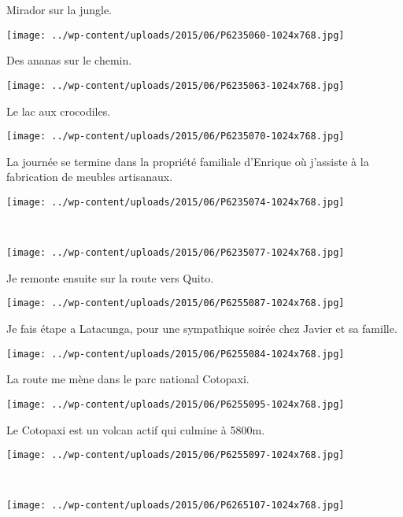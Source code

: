 Mirador sur la jungle. \\
\begin{center} 
\texttt{[image: ../wp-content/uploads/2015/06/P6235060-1024x768.jpg]} 
\end{center}

Des ananas sur le chemin. 
\begin{center} 
\texttt{[image: ../wp-content/uploads/2015/06/P6235063-1024x768.jpg]} 
\end{center}
\vspace{-\topsep}
\pagebreak

Le lac aux crocodiles. 
\begin{center} 
\texttt{[image: ../wp-content/uploads/2015/06/P6235070-1024x768.jpg]} 
\end{center}

La journée se termine dans la propriété familiale d'Enrique où j'assiste à la fabrication de meubles artisanaux. 
\begin{center} 
\texttt{[image: ../wp-content/uploads/2015/06/P6235074-1024x768.jpg]} 
\end{center}
\vspace{-\topsep}
\pagebreak
~
\begin{center} 
\texttt{[image: ../wp-content/uploads/2015/06/P6235077-1024x768.jpg]} 
\end{center}

Je remonte ensuite sur la route vers Quito. \\
\begin{center} 
\texttt{[image: ../wp-content/uploads/2015/06/P6255087-1024x768.jpg]} 
\end{center}
\vspace{-\topsep}
\pagebreak

Je fais étape a Latacunga, pour une sympathique soirée chez Javier et sa famille. 
\begin{center} 
\texttt{[image: ../wp-content/uploads/2015/06/P6255084-1024x768.jpg]} 
\end{center}

La route me mène dans le parc national Cotopaxi. 
\begin{center} 
\texttt{[image: ../wp-content/uploads/2015/06/P6255095-1024x768.jpg]} 
\end{center}
\vspace{-\topsep}
\pagebreak

Le Cotopaxi est un volcan actif qui culmine à 5800m. \\
\begin{center} 
\texttt{[image: ../wp-content/uploads/2015/06/P6255097-1024x768.jpg]} 
\end{center}
~
\begin{center} 
\texttt{[image: ../wp-content/uploads/2015/06/P6265107-1024x768.jpg]} 
\end{center}
\vspace{-\topsep}
\pagebreak

